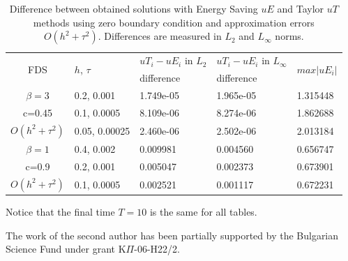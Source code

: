 \documentclass[%
 aip,
cp,  %
 amsmath,amssymb,%
 reprint,%
]{revtex4-2}
\begin{document}
\begin{table}[ht]
\centering
\small
		\begin{tabular}{||c|l|l|l|l||}
			\hline
			\hline
      \multirow{2  }{*}{FDS}        & \multirow{2  }{*}{$h$, $\tau$}  &   $uT_i - uE_i$  in $L_2$     &  $uT_i - uE_i$ in $L_\infty$ & \multirow{2  }{*}{$max|uE_i|$} \\
	                                        &                                                     &      difference                     &           difference                  &                                                       \\
   			\hline 
					\hline 
  $\beta=3$                   &0.2, 0.001         &  1.749e-05      &  1.965e-05  & 1.315448     \\
   c=0.45                        &0.1, 0.0005        &  8.109e-06       & 8.274e-06 &  1.862688     \\
     $O(h^2 + \tau^ 2)$ &0.05, 0.00025     & 2.460e-06         &2.502e-06  &   2.013184   \\
			\hline 
			\hline 
       $\beta=1$          &0.4, 0.002        & 0.009981     & 0.004560 & 0.656747   \\
                  c=0.9      &0.2, 0.001        & 0.005047      & 0.002373  & 0.673901   \\
  $O(h^2+ \tau^2)$ &0.1, 0.0005         & 0.002521      &0.001117 & 0.672231   \\
			\hline
	   \hline
			\hline 
		\end{tabular}
		\caption{Difference between obtained solutions with Energy Saving $uE$ and Taylor $uT$ methods using zero boundary condition and approximation errors $O(h^{2} + \tau^2 )$. Differences are measured in $L_2$ and $L_\infty$ norms.}
\label{tableF}
\end{table}

Notice that the final time $T=10$  is the same for all tables.

\begin{acknowledgments}
The work of the second author has been partially supported by
the Bulgarian Science Fund under grant K$\Pi$-06-H22/2.
\end{acknowledgments}

\end{document}
